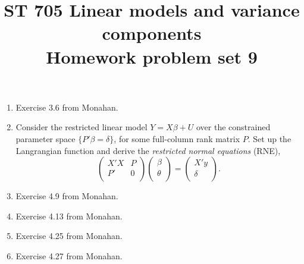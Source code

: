 \documentclass[11pt]{article}
\title{ST 705 Linear models and variance components \\ 
        Homework problem set 9}
\begin{document}
\maketitle

\begin{enumerate}

\item Exercise 3.6 from Monahan.

\item Consider the restricted linear model $Y = X\beta + U$ over the constrained parameter space $\{P'\beta = \delta\}$, for some full-column rank matrix $P$.  Set up the Langrangian function and derive the {\em restricted normal equations} (RNE),
\[
\begin{pmatrix}
X'X & P \\
P' & 0 \\
\end{pmatrix}
\begin{pmatrix}
\beta \\
\theta \\
\end{pmatrix} = 
\begin{pmatrix}
X'y \\
\delta \\
\end{pmatrix}.
\]

\item Exercise 4.9 from Monahan.

\item Exercise 4.13 from Monahan.

\item Exercise 4.25 from Monahan.

\item Exercise 4.27 from Monahan.


\end{enumerate}
\end{document}
